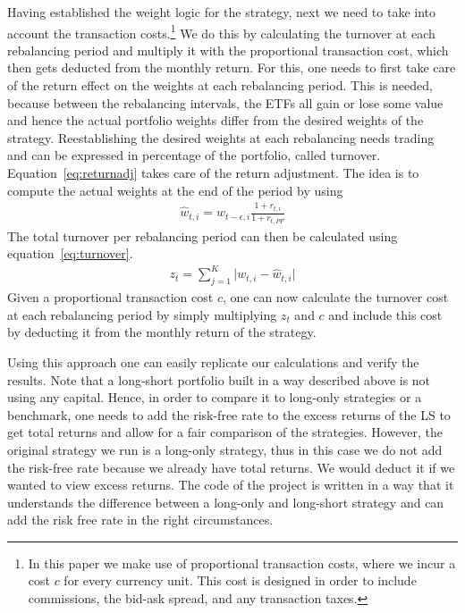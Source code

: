 \documentclass[a4paper,12pt,twoside]{article}
\begin{document}
Having established the weight logic for the strategy, next we need to take into account the transaction costs.\footnote{In this paper we make use of proportional transaction costs, where we incur a cost $c$ for every currency unit. This cost is designed in order to include commissions, the bid-ask
spread, and any transaction taxes.}
We do this by calculating the turnover at each rebalancing period and multiply it with the proportional transaction cost, which then gets deducted from the monthly return.
For this, one needs to first take care of the return effect on the weights at each rebalancing period. This is needed, because between the rebalancing intervals, the ETFs all gain or lose some value and hence the actual portfolio weights differ from the desired weights of the strategy. Reestablishing the desired weights at each rebalancing needs trading and can be expressed in percentage of the portfolio, called turnover. Equation~\ref{eq:returnadj} takes care of the return adjustment. The idea is to compute the actual weights at the end of the period by using
\begin{align}
\hat{w}_{t,i} = w_{t-\epsilon,i} \frac{1+r_{t,i}}{1+r_{t,PF}}
 \label{eq:returnadj}
\end{align}
The total turnover per rebalancing period can then be calculated using equation~\ref{eq:turnover}.
\begin{align}
z_{t} = \sum_{j=1}^{K}\lvert w_{t,i} - \hat{w}_{t,i}\rvert
 \label{eq:turnover}
\end{align}
Given a proportional transaction cost $c$, one can now calculate the turnover cost at each rebalancing period by simply multiplying $z_t$ and $c$ and include this cost by deducting it from the monthly return of the strategy.\par
Using this approach one can easily replicate our calculations and verify the results. Note that a long-short portfolio built in a way described above is not using any capital. Hence, in order to compare it to long-only strategies or a benchmark, one needs to add the risk-free rate to the excess returns of the LS to get total returns and allow for a fair comparison of the strategies. However, the original strategy we run is a long-only strategy, thus in this case we do not add the risk-free rate because we already have total returns. We would deduct it if we wanted to view excess returns. The code of the project is written in a way that it understands the difference between a long-only and long-short strategy and can add the risk free rate in the right circumstances.
\end{document}
